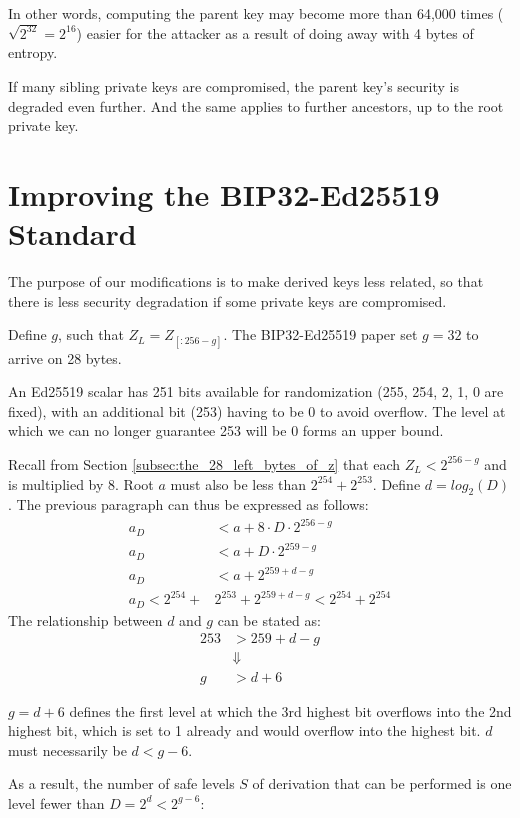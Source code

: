 \documentclass[12pt, a4paper, twocolumn]{article}
\begin{document}
In other words, computing the parent key may become more than 64,000 times ($\sqrt{2^{32}}=2^{16}$) easier for the attacker as a result of doing away with 4 bytes of entropy.

If many sibling private keys are compromised, the parent key's security is degraded even further. And the same applies to further ancestors, up to the root private key.

\section{Improving the BIP32-Ed25519 Standard}

The purpose of our modifications is to make derived keys less related, so that there is less security degradation if some private keys are compromised.

Define $g$, such that $Z_L = Z_{[:256-g]}$. The BIP32-Ed25519 paper\cite{BIP32-Ed25519} set $g=32$ to arrive on 28 bytes.

An Ed25519 scalar has 251 bits available for randomization (255, 254, 2, 1, 0 are fixed), with an additional bit (253) having to be 0 to avoid overflow. The level at which we can no longer guarantee 253 will be 0 forms an upper bound.

Recall from Section \ref{subsec:the_28_left_bytes_of_z} that each $Z_L < 2^{256 - g}$ and is multiplied by 8. Root $a$ must also be less than $2^{254} + 2^{253}$. Define $d = log_2(D)$. The previous paragraph can thus be expressed as follows:
\begin{align*}
  a_D &< a + 8\cdot D\cdot2^{256 - g} \\
  a_D &< a + D\cdot2^{259 - g} \\
  a_D &< a + 2^{259 + d - g}\\
  a_D < 2^{254} +& 2^{253} + 2^{259 + d - g} < 2^{254} + 2^{254}
\end{align*}
The relationship between $d$ and $g$ can be stated as:
\begin{align*}
  253 &> 259 + d - g \\
  &\Downarrow \\
  g &> d + 6
\end{align*}

 $g = d + 6$ defines the first level at which the 3rd highest bit overflows into the 2nd highest bit, which is set to 1 already and would overflow into the highest bit. $d$ must necessarily be $d < g - 6$.

 As a result, the number of safe levels $S$ of derivation that can be performed is one level fewer than $D = 2^{d} < 2^{g - 6}$:
\end{document}
